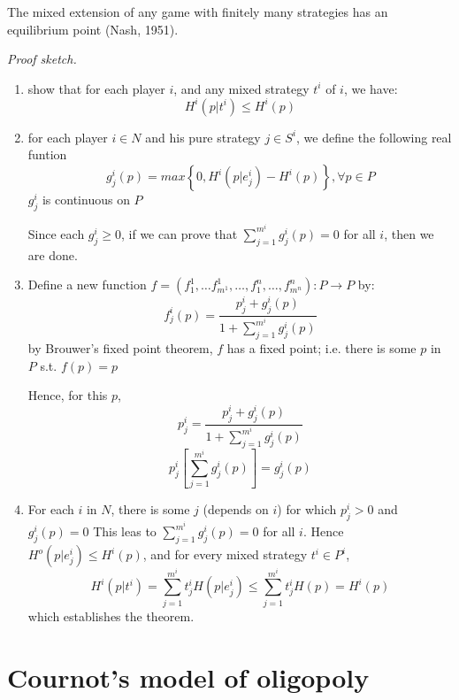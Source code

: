 \documentclass[11pt,a4paper]{article}
\begin{document}
The mixed extension of any game with finitely many strategies has an equilibrium point (Nash, 1951). \par
\textit{Proof sketch.}
\begin{enumerate}
    \item [(1)] show that for each player $i$, and any mixed strategy $t^i$ of $i$, we have:
        \[
        H^i(p|t^i) \leqslant H^i(p)
        \]


    \item [(2)]
        for each player $i \in N$ and his pure strategy $j \in S^i$, we define the following real funtion
        \[
        g_j^i(p) = max\left\{0, H^i(p|e_j^i) - H^i(p)\right\}, \forall p \in P
        \]
        $g_j^i$ is continuous on $P$ \par
        Since each $g_j^i \geqslant 0$, if we can prove that $\sum_{j=1}^{m^i} g_j^i(p) = 0$ for all $i$, then we are done. \par
    
    \item [(3)]
        Define a new function $f = (f_1^1, \dots f_{m^1}^1, \dots, f_1^n, \dots, f_{m^n}^n) : P \rightarrow P$ by:
        \[
        f_j^i(p) = \frac{p_j^i + g_j^i(p)}{1 + \sum_{j=1}^{m^i} g_j^i(p)}
        \]
        by Brouwer's fixed point theorem, $f$ has a fixed point; i.e. there is some $p$ in $P$ s.t. $f(p) = p$ \par
        Hence, for this $p$,
        \[
        p_j^i = \frac{p_j^i + g_j^i(p)}{1 + \sum_{j=1}^{m^i} g_j^i(p)}
        \]
        \[
        p_j^i \left[\sum_{j=1}^{m^i} g_j^i(p) \right] = g_j^i(p)
        \]

    \item [(4)]
        For each $i$ in $N$, there is some $j$ (depends on $i$) for which $p_j^i > 0$ and $g_j^i(p) = 0$
        This leas to $\sum_{j=1}^{m^i} g_j^i(p) = 0$ for all $i$.
        Hence $H^o(p|e_j^i) \leqslant H^i(p)$, and for every mixed strategy $t^i \in P^i$,
        \[
        H^i(p|t^i) = \sum_{j=1}^{m^i} t_j^i H(p|e_j^i) \leqslant \sum_{j=1}^{m^i} t_j^i H(p) = H^i(p)
        \]
        which establishes the theorem.
    
\end{enumerate}

\section{Cournot's model of oligopoly}
\end{document}
